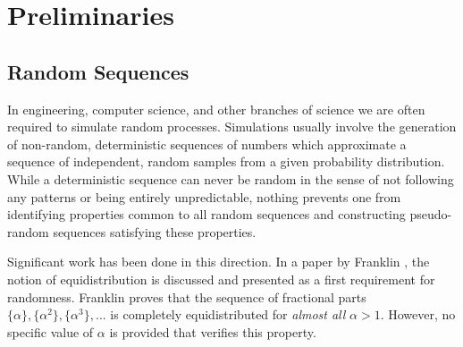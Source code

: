 \documentclass[11pt,a4paper]{tesis}
\theoremstyle{plain}
\theoremstyle{definition}
\begin{document}

\def\autor{Emilio Guido Almansi}
\def\tituloTesis{Secuencias completamente equidistribuidas basadas en secuencias de Ford}
\def\runtitulo{La Guerra de las Galaxias: Rebelión e Imperio}
\def\runtitle{Star Wars: Rebellion and Empire}
\def\director{Verónica Becher}
\def\lugar{Buenos Aires, 2019}




% 




\cleardoublepage
\tableofcontents

\mainmatter
\pagestyle{headings}

\chapter{Preliminaries}\label{chapter:preliminaries}

\section{Random Sequences}

In engineering, computer science, and other branches of science we are often required to simulate random processes. Simulations usually involve the generation of non-random, deterministic sequences of numbers which approximate a sequence of independent, random samples from a given probability distribution. While a deterministic sequence can never be random in the sense of not following any patterns or being entirely unpredictable, nothing prevents one from identifying properties common to all random sequences and constructing pseudo-random sequences satisfying these properties.

Significant work has been done in this direction. In a paper by Franklin \cite{franklin-1963}, the notion of equidistribution is discussed and presented as a first requirement for randomness. Franklin proves that the sequence of fractional parts $\{ \alpha \}, \{ \alpha^2 \}, \{ \alpha^3 \}, ...$ is completely equidistributed for \textit{almost all} $\alpha > 1$. However, no specific value of $\alpha$ is provided that verifies this property.
\end{document}
